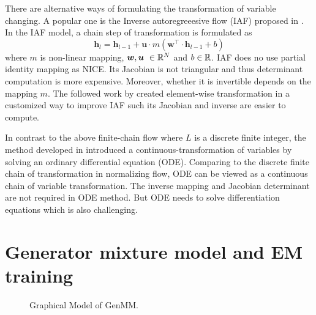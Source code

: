 \begin{remark}
  There are alternative ways of formulating the transformation of variable changing. A popular one is the Inverse autoregreeesive flow (IAF) proposed in \cite{rezende2015variational}. In the IAF model, a chain step of transformation is formulated as
  \begin{equation*}
    \bm{h}_l = \bm{h}_{l-1} + \bm{u} \cdot {m}(\bm{w}^{\intercal} \cdot \bm{h}_{l-1} + b)
  \end{equation*}
  where $m$ is non-linear mapping, $\bm{w}, \bm{u}~\in \mathbb{R}^{N}$ and $b\in \mathbb{R}$. IAF does no use partial identity mapping as NICE. Its Jacobian is not triangular and thus determinant computation is more expensive. Moreover, whether it is invertible depends on the mapping $m$. The followed work by \cite{kingma2016IVF} created element-wise transformation in a customized way to improve IAF such its Jacobian and inverse are easier to compute. 
  
  In contrast to the above finite-chain flow where $L$ is a discrete finite integer, the method developed in \cite{ricky2018ODE} introduced a continuous-transformation of variables by solving an ordinary differential equation (ODE). Comparing to the discrete finite chain of transformation in normalizing flow, ODE can be viewed as a continuous chain of variable transformation. The inverse mapping and Jacobian determinant are not required in ODE method. But ODE needs to solve differentiation equations which is also challenging.
\end{remark}

\section{Generator mixture model and EM training}

\begin{figure}[tp!]
  \centering
  \caption{Graphical Model of GenMM.}\label{chpt6:fig:genmm-graph}
\end{figure}

